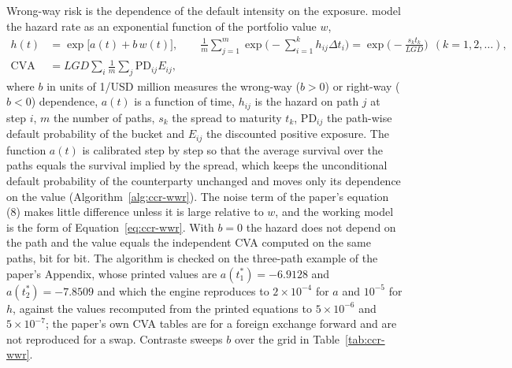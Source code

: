 Wrong-way risk is the dependence of the default intensity on the exposure. \citet{ccr:hullwhite2012} model the hazard rate as an exponential function of the portfolio value $w$,
\begin{equation}
\begin{aligned}
h(t)&=\exp\big[a(t)+b\,w(t)\big],\qquad \frac{1}{m}\sum_{j=1}^{m}\exp\Big(-\sum_{i=1}^{k}h_{ij}\Delta t_i\Big)=\exp\Big(-\frac{s_kt_k}{LGD}\Big)\ \ (k=1,2,\dots),\\
\mathrm{CVA}&=LGD\sum_i\frac{1}{m}\sum_j\mathrm{PD}_{ij}E_{ij},
\end{aligned}
\label{eq:ccr-wwr}
\end{equation}
where $b$ in units of 1/USD million measures the wrong-way ($b>0$) or right-way ($b<0$) dependence, $a(t)$ is a function of time, $h_{ij}$ is the hazard on path $j$ at step $i$, $m$ the number of paths, $s_k$ the spread to maturity $t_k$, $\mathrm{PD}_{ij}$ the path-wise default probability of the bucket and $E_{ij}$ the discounted positive exposure.
The function $a(t)$ is calibrated step by step so that the average survival over the paths equals the survival implied by the spread, which keeps the unconditional default probability of the counterparty unchanged and moves only its dependence on the value (Algorithm~\ref{alg:ccr-wwr}). The noise term of the paper's equation (8)
makes little difference unless it is large relative to $w$, and the working model is the form of Equation~\ref{eq:ccr-wwr}. With $b=0$ the hazard does not depend on the path and the value equals the independent CVA computed on the same paths, bit for bit. The algorithm is checked on the three-path example of the paper's Appendix, whose printed values are
$a(t_1^\ast)=-6.9128$ and $a(t_2^\ast)=-7.8509$ and which the engine reproduces to $2\times10^{-4}$ for $a$ and $10^{-5}$ for $h$, against the values recomputed from the printed equations to $5\times10^{-6}$ and $5\times10^{-7}$; the paper's own CVA tables are for a foreign exchange forward
and are not reproduced for a swap. Contraste sweeps $b$ over the grid in Table~\ref{tab:ccr-wwr}.

